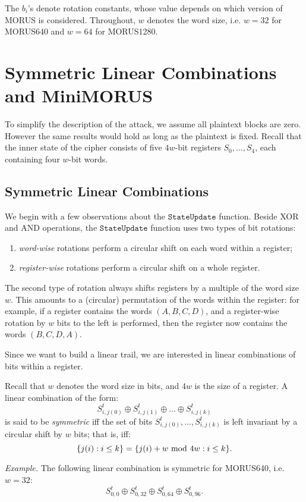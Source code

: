 \documentclass{llncs}
\newcommand{\cipher}[1]{\textsf{#1}}
\newcommand\StateUpdate{\ensuremath{\texttt{StateUpdate}}}
\begin{document}
The $b_i$'s denote rotation constants, whose value depends on which version of \cipher{MORUS} is considered. Throughout, $w$ denotes the  word size, i.e. $w=32$ for \cipher{MORUS640} and $w=64$ for \cipher{MORUS1280}.

\section{Symmetric Linear Combinations and \cipher{MiniMORUS}}
\label{sec:introminimorus}

To simplify the description of the attack, we assume all plaintext blocks are zero. However the same results would hold as long as the plaintext is fixed. Recall that the inner state of the cipher consists of five $4w$-bit registers $S_0,\dots,S_4$, each containing four $w$-bit words.

\subsection{Symmetric Linear Combinations}

We begin with a few observations about the \StateUpdate{} function. Beside XOR and AND operations, the \StateUpdate{} function uses two types of bit rotations:
\begin{enumerate}
\item \emph{word-wise} rotations perform a circular shift on each word within a register;
\item \emph{register-wise} rotations perform a circular shift on a whole register.
\end{enumerate}
The second type of rotation always shifts registers by a multiple of the word size $w$. This amounts to a (circular) permutation of the words within the register: for example, if a register contains the words $(A, B, C, D)$, and a register-wise rotation by $w$ bits to the left is performed, then the register now contains the words $(B, C, D, A)$.

Since we want to build a linear trail, we are interested in linear combinations of bits within a register.
\begin{definition}
Recall that $w$ denotes the word size in bits, and $4w$ is the size of a register. A linear combination of the form:
\[
S^t_{i,j(0)} \oplus S^t_{i,j(1)} \oplus \dots \oplus S^t_{i,j(k)}
\]
is said to be \emph{symmetric} iff the set of bits $S^t_{i,j(0)}, \dots, S^t_{i,j(k)}$ is left invariant by a circular shift by $w$ bits; that is, iff:
\[
\{j(i) : i\leq k\} = \{j(i) + w \text{\rm{} mod } 4w : i\leq k\}.
\]
\end{definition}
\emph{Example.} The following linear combination is symmetric for \cipher{MORUS640}, i.e. $w = 32$:
\begin{equation}
S^t_{0,0} \oplus S^t_{0,32} \oplus S^t_{0,64} \oplus S^t_{0,96}.
\label{eq:symmetric}
\end{equation}
\end{document}
